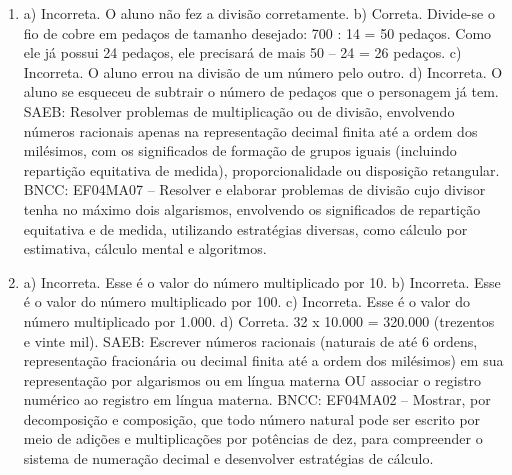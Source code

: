 \begin{enumerate}
\item
a) Incorreta. O aluno não fez a divisão corretamente.
b) Correta. Divide-se o fio de cobre em pedaços de tamanho desejado: 700 : 14 = 50
pedaços. Como ele já possui 24 pedaços, ele precisará de mais 50 -- 24 = 26 pedaços.
c) Incorreta. O aluno errou na divisão de um número pelo outro.
d) Incorreta. O aluno se esqueceu de subtrair o número de pedaços que o personagem já tem.
SAEB: Resolver problemas de multiplicação ou de divisão,
envolvendo números racionais apenas na representação decimal finita até
a ordem dos milésimos, com os significados de formação de grupos iguais
(incluindo repartição equitativa de medida), proporcionalidade ou
disposição retangular.
BNCC: EF04MA07 -- Resolver e elaborar problemas de divisão cujo divisor tenha no máximo dois algarismos,
envolvendo os significados de repartição equitativa e de medida, utilizando estratégias diversas,
como cálculo por estimativa, cálculo mental e algoritmos.

\item
a) Incorreta. Esse é o valor do número multiplicado por 10.
b) Incorreta. Esse é o valor do número multiplicado por 100.
c) Incorreta. Esse é o valor do número multiplicado por 1.000.
d) Correta. 32 x 10.000 = 320.000 (trezentos e vinte mil).
SAEB: Escrever números racionais (naturais de até 6 ordens, representação
fracionária ou decimal finita até a ordem dos milésimos) em sua
representação por algarismos ou em língua materna OU associar o registro
numérico ao registro em língua materna.
BNCC: EF04MA02 -- Mostrar, por decomposição e composição, que todo número natural pode ser escrito
por meio de adições e multiplicações por potências de dez, para compreender o sistema de
numeração decimal e desenvolver estratégias de cálculo.
\end{enumerate}


